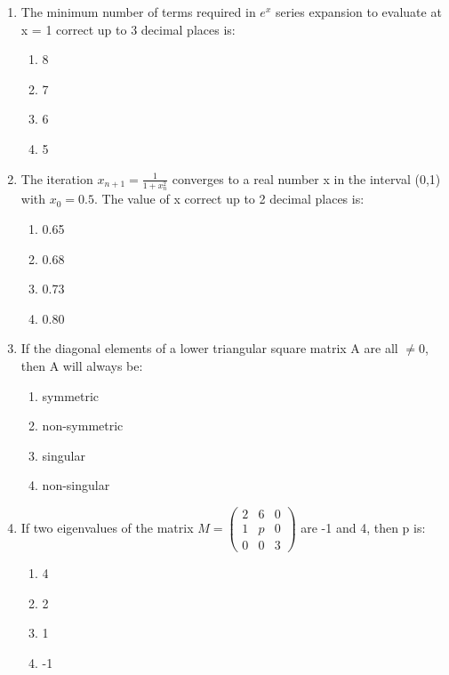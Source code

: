 \documentclass[journal,cmex10]{IEEEtran}
\theoremstyle{remark}
\newcommand{\myvec}[1]{\ensuremath{\begin{pmatrix}#1\end{pmatrix}}}
\numberwithin{equation}{enumi}
\numberwithin{figure}{enumi}
\begin{document}
\begin{enumerate}[label=\arabic*)]
    \item The minimum number of terms required in $e^x$ series expansion to evaluate at x = 1 correct up to 3 decimal places is:
    \bigskip
    \hfill {}
    \begin{enumerate}[label=\alph*)]
        \item 8
        \item 7
        \item 6
        \item 5
    \end{enumerate}
    \bigskip

    \item The iteration $x_{n+1} = \frac{1}{1+x_n^2}$ converges to a real number x in the interval (0,1) with $x_0 = 0.5$. The value of x correct up to 2 decimal places is:
    \bigskip
    \hfill {}
    \begin{enumerate}[label=\alph*)]
        \item 0.65
        \item 0.68
        \item 0.73
        \item 0.80
    \end{enumerate}
    \bigskip

    \item If the diagonal elements of a lower triangular square matrix A are all $\neq 0$, then A will always be:
    \bigskip
    \hfill {}
    \begin{enumerate}[label=\alph*)]
        \item symmetric
        \item non-symmetric
        \item singular
        \item non-singular
    \end{enumerate}
    \bigskip

    \item If two eigenvalues of the matrix $M = \myvec{2 & 6 & 0 \\ 1 & p & 0 \\ 0 & 0 & 3}$ are -1 and 4, then p is:
    \bigskip
    \hfill {}
    \begin{enumerate}[label=\alph*)]
        \item 4
        \item 2
        \item 1
        \item -1
    \end{enumerate}
    \bigskip


\end{enumerate}
\end{document}
